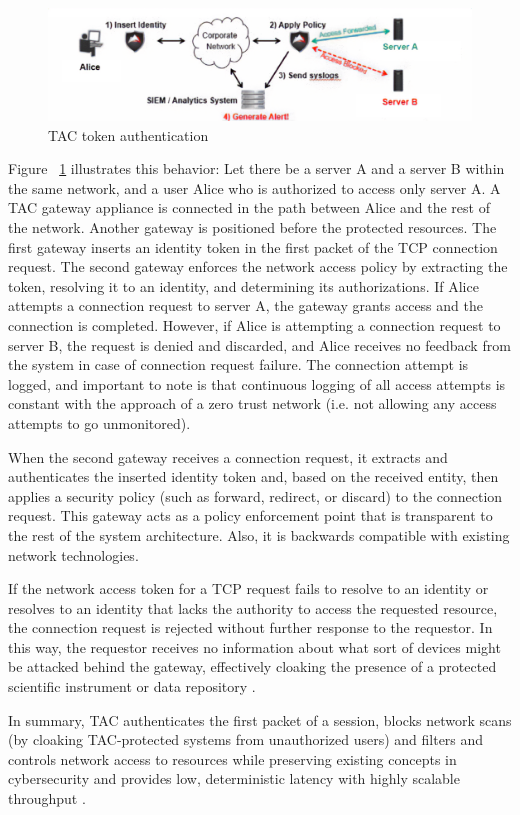 \begin{figure}[h]
    \centering
    \includegraphics[width=\textwidth]{figures/alice_tac.PNG}
    \caption{TAC token authentication \cite{8494695}}
    \label{fig:alice_tac}
\end{figure}

Figure ~\ref{fig:alice_tac} illustrates this behavior: Let there be a server A and a server B within the same network, and a user Alice who is authorized to access only server A.  A TAC gateway appliance is connected in the path between Alice and the rest of the network.  Another gateway is positioned before the protected resources.  The first gateway inserts an identity token in the first packet of the TCP connection request.  The second gateway enforces the network access policy by extracting the token, resolving it to an identity, and determining its authorizations.  If Alice attempts a connection request to server A, the gateway grants access and the connection is completed.  However, if Alice is attempting a connection request to server B, the request is denied and discarded, and Alice receives no feedback from the system in case of connection request failure.  The connection attempt is logged, and important to note is that continuous logging of all access attempts is constant with the approach of a zero trust network (i.e. not allowing any access attempts to go unmonitored).\par

When the second gateway receives a connection request, it extracts and authenticates the inserted identity token and, based on the received entity, then applies a security policy (such as forward, redirect, or discard) to the connection request.  This gateway acts as a policy enforcement point that is transparent to the rest of the system architecture. Also, it is backwards compatible with existing network technologies.\par  
If the network access token for a TCP request fails to resolve to an identity or resolves to an identity that lacks the authority to access the requested resource, the connection request is rejected without further response to the requestor.  In this way, the requestor receives no information about what sort of devices might be attacked behind the gateway, effectively cloaking the presence of a protected scientific instrument or data repository \cite{blackridge}.\\\par

In summary, TAC authenticates the first packet of a session, blocks network scans (by cloaking TAC-protected systems from unauthorized users) and filters and controls network access to resources while preserving existing concepts in cybersecurity and provides low, deterministic latency with highly scalable throughput \cite{blackridge}.\par
